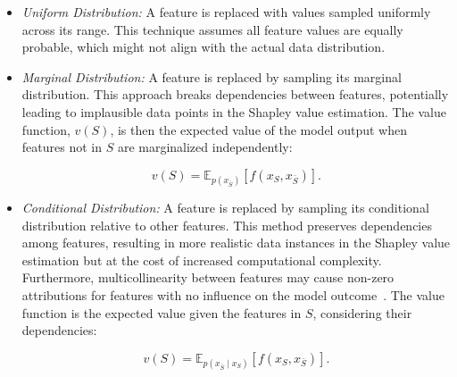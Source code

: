 \begin{itemize}
    \item \textit{Uniform Distribution:} A feature is replaced with values sampled uniformly across its range. This technique assumes all feature values are equally probable, which might not align with the actual data distribution.
    \item \textit{Marginal Distribution:} A feature is replaced by sampling its marginal distribution. This approach breaks dependencies between features, potentially leading to implausible data points in the Shapley value estimation. The value function, \( v(S) \), is then the expected value of the model output when features not in \( S \) are marginalized independently:
    
    \begin{equation}
    v(S) = \mathbb{E}_{p(x_{\bar{S}})}[f(x_S, x_{\bar{S}})].
    \label{eq:shapleyvalues-marginal}
    \end{equation}
    
    \item \textit{Conditional Distribution:} A feature is replaced by sampling its conditional distribution relative to other features. This method preserves dependencies among features, resulting in more realistic data instances in the Shapley value estimation but at the cost of increased computational complexity. Furthermore, multicollinearity between features may cause non-zero attributions for features with no influence on the model outcome~\cite{chen2023algorithms}. The value function is the expected value given the features in \( S \), considering their dependencies:
    
    \begin{equation}
    v(S) = \mathbb{E}_{p(x_{\bar{S}} \mid x_S)}[f(x_S, x_{\bar{S}})].
    \label{eq:shapleyvalues-conditional}
    \end{equation}
\end{itemize}




